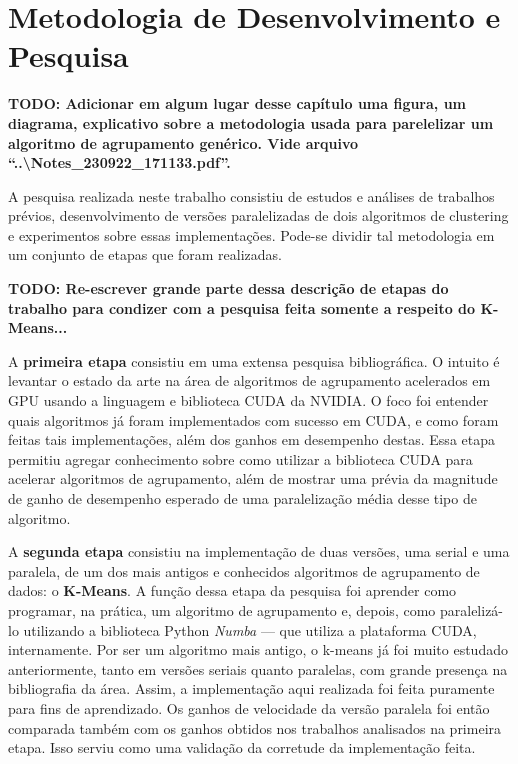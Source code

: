 \documentclass[12pt,
openright, 
oneside, %
a4paper,    %
brazil]{facom-ufu-abntex2}
\def\qntAlgrtm{dois}
\begin{document}
\chapter{Metodologia de Desenvolvimento e Pesquisa}

\textbf{TODO: Adicionar em algum lugar desse capítulo uma figura, um diagrama, explicativo sobre a metodologia usada para parelelizar um algoritmo de agrupamento genérico. Vide arquivo \enquote{..\textbackslash Notes\_230922\_171133.pdf}.}


A pesquisa realizada neste trabalho consistiu de estudos e análises de trabalhos prévios, desenvolvimento de versões paralelizadas de \qntAlgrtm{} algoritmos de clustering e experimentos sobre essas implementações. Pode-se dividir tal metodologia em um conjunto de etapas que foram realizadas.

\textbf{TODO: Re-escrever grande parte dessa descrição de etapas do trabalho para condizer com a pesquisa feita somente a respeito do K-Means...}


A \textbf{primeira etapa} consistiu em uma extensa pesquisa bibliográfica. O intuito é levantar o estado da arte na área de algoritmos de agrupamento acelerados em GPU usando a linguagem e biblioteca CUDA da NVIDIA. O foco foi entender quais algoritmos já foram implementados com sucesso em CUDA, e como foram feitas tais implementações, além dos ganhos em desempenho destas. Essa etapa permitiu agregar conhecimento sobre como utilizar a biblioteca CUDA para acelerar algoritmos de agrupamento, além de mostrar uma prévia da magnitude de ganho de desempenho esperado de uma paralelização média desse tipo de algoritmo.

A \textbf{segunda etapa} consistiu na implementação de duas versões, uma serial e uma paralela, de um dos mais antigos e conhecidos algoritmos de agrupamento de dados: o \textbf{K-Means}. A função dessa etapa da pesquisa foi aprender como programar, na prática, um algoritmo de agrupamento e, depois, como paralelizá-lo utilizando a biblioteca Python \textit{Numba} --- que utiliza a plataforma CUDA, internamente. Por ser um algoritmo mais antigo, o k-means já foi muito estudado anteriormente, tanto em versões seriais quanto paralelas, com grande presença na bibliografia da área. Assim, a implementação aqui realizada foi feita puramente para fins de aprendizado. Os ganhos de velocidade da versão paralela foi então comparada também com os ganhos obtidos nos trabalhos analisados na primeira etapa. Isso serviu como uma validação da corretude da implementação feita.
\end{document}
